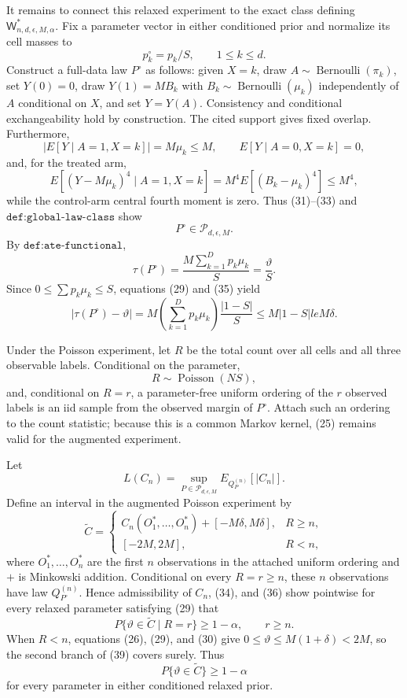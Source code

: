 It remains to connect this relaxed experiment to the exact class defining \(\mathsf W^*_{n,d,\epsilon,M,\alpha}\).  Fix a parameter vector in either conditioned prior and normalize its cell masses to
\[
 p_k^\circ=p_k/S,\qquad 1\le k\le d.
\tag{31}
\]
Construct a full-data law \(P^\circ\) as follows: given \(X=k\), draw
\(A\sim\operatorname{Bernoulli}(\pi_k)\), set \(Y(0)=0\), draw
\(Y(1)=M B_k\) with \(B_k\sim\operatorname{Bernoulli}(\mu_k)\) independently of \(A\) conditional on \(X\), and set \(Y=Y(A)\).  Consistency and conditional exchangeability hold by construction.  The cited support gives fixed overlap.  Furthermore,
\[
 |E[Y\mid A=1,X=k]|=M\mu_k\le M,
 \qquad E[Y\mid A=0,X=k]=0,
\tag{32}
\]
and, for the treated arm,
\[
 E[(Y-M\mu_k)^4\mid A=1,X=k]
 =M^4E[(B_k-\mu_k)^4]
 \le M^4,
\tag{33}
\]
while the control-arm central fourth moment is zero.  Thus (31)--(33) and
\(\texttt{def:global-law-class}\) show
\[
 P^\circ\in\mathcal P_{d,\epsilon,M}.
\tag{34}
\]
By \(\texttt{def:ate-functional}\),
\[
 \tau(P^\circ)=\frac{M\sum_{k=1}^Dp_k\mu_k}{S}
 =\frac{\vartheta}{S}.
\tag{35}
\]
Since \(0\le\sum p_k\mu_k\le S\), equations (29) and (35) yield
\[
 |\tau(P^\circ)-\vartheta|
 =M\left(\sum_{k=1}^Dp_k\mu_k\right)
   \frac{|1-S|}{S}
 \le M|1-S|le M\delta.
\tag{36}
\]

Under the Poisson experiment, let \(R\) be the total count over all cells and all three observable labels.  Conditional on the parameter,
\[
 R\sim\operatorname{Poisson}(NS),
\tag{37}
\]
and, conditional on \(R=r\), a parameter-free uniform ordering of the \(r\) observed labels is an iid sample from the observed margin of \(P^\circ\).  Attach such an ordering to the count statistic; because this is a common Markov kernel, (25) remains valid for the augmented experiment.

Let
\[
 L(C_n)=\sup_{P\in\mathcal P_{d,\epsilon,M}}
 E_{Q_P^{(n)}}[|C_n|].
\tag{38}
\]
Define an interval in the augmented Poisson experiment by
\[
 \widetilde C=
 \begin{cases}
 C_n(O_1^*,\ldots,O_n^*)+[-M\delta,M\delta],&R\ge n,\\
 [-2M,2M],&R<n,
 \end{cases}
\tag{39}
\]
where \(O_1^*,\ldots,O_n^*\) are the first \(n\) observations in the attached uniform ordering and \(+\) is Minkowski addition.  Conditional on every \(R=r\ge n\), these \(n\) observations have law \(Q_{P^\circ}^{(n)}\).  Hence admissibility of \(C_n\), (34), and (36) show pointwise for every relaxed parameter satisfying (29) that
\[
 P\{\vartheta\in\widetilde C\mid R=r\}\ge1-\alpha,
 \qquad r\ge n.
\tag{40}
\]
When \(R<n\), equations (26), (29), and (30) give
\(0\le\vartheta\le M(1+\delta)<2M\), so the second branch of (39) covers surely.  Thus
\[
 P\{\vartheta\in\widetilde C\}\ge1-\alpha
\tag{41}
\]
for every parameter in either conditioned relaxed prior.

